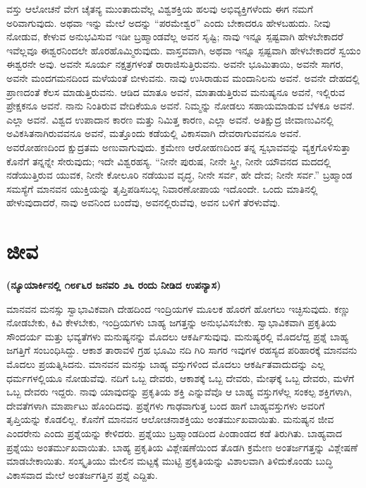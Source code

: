 
ವಸ್ತು ಆಲೋಚನೆ ವೇಗ ಚೈತನ್ಯ ಮುಂತಾದುವೆಲ್ಲ ವಿಶ್ವಶಕ್ತಿಯ ಹಲವು ಅಭಿವ್ಯಕ್ತಿಗಳೆಂದು ಈಗ ನಮಗೆ ಅರಿವಾಗುವುದು. ಅಥವಾ ಇನ್ನು ಮೇಲೆ ಅದನ್ನು “ಪರಮೇಶ್ವರ” ಎಂದು ಬೇಕಾದರೂ ಹೇಳಬಹುದು. ನೀವು ನೋಡುವ, ಕೇಳುವ ಅನುಭವಿಸುವ ಇಡೀ ಬ್ರಹ್ಮಾಂಡವೆಲ್ಲ ಅವನ ಸೃಷ್ಟಿ; ನಾವು ಇನ್ನೂ ಸ್ಪಷ್ಟವಾಗಿ ಹೇಳಬೇಕಾದರೆ ಇವೆಲ್ಲವೂ ಈಶ್ವರನಿಂದಲೇ ಹೊರಹೊಮ್ಮಿರುವುದು. ವಾಸ್ತವವಾಗಿ, ಅಥವಾ ಇನ್ನೂ ಸ್ಪಷ್ಟವಾಗಿ ಹೇಳಬೇಕಾದರೆ ಸ್ವಯಂ ಈಶ್ವರನೇ ಅವು. ಅವನೇ ಸೂರ್ಯ ನಕ್ಷತ್ರಗಳಂತೆ ರಾರಾಜಿಸುತ್ತಿರುವನು. ಅವನೇ ಭೂಮಿತಾಯಿ, ಅವನೇ ಸಾಗರ, ಅವನೇ ಮಂದಗಮನದಿಂದ ಮಳೆಯಂತೆ ಬೀಳುವನು. ನಾವು ಉಸಿರಾಡುವ ಮಂದಾನಿಲನು ಅವನೆ. ಅವನೇ ದೇಹದಲ್ಲಿ ಪ್ರಾಣದಂತೆ ಕೆಲಸ ಮಾಡುತ್ತಿರುವನು. ಆಡಿದ ಮಾತೂ ಅವನೆ, ಮಾತಾಡುತ್ತಿರುವ ಮನುಷ್ಯನೂ ಅವನೆ, ಇಲ್ಲಿರುವ ಪ್ರೇಕ್ಷಕನೂ ಅವನೆ. ನಾನು ನಿಂತಿರುವ ವೇದಿಕೆಯೂ ಅವನೆ. ನಿಮ್ಮನ್ನು ನೋಡಲು ಸಹಾಯಮಾಡುವ ಬೆಳಕೂ ಅವನೆ. ಎಲ್ಲಾ ಅವನೆ. ವಿಶ್ವದ ಉಪಾದಾನ ಕಾರಣ ಮತ್ತು ನಿಮಿತ್ತ ಕಾರಣ, ಎಲ್ಲಾ ಅವನೆ. ಅತಿಕ್ಷುದ್ರ ಜೀವಾಣುವಿನಲ್ಲಿ ಅವಿಕಸಿತನಾಗಿರುವವನೂ ಅವನೆ, ಮತ್ತೊಂದು ಕಡೆಯಲ್ಲಿ ವಿಕಾಸವಾಗಿ ದೇವರಾಗುವವನೂ ಅವನೆ. ಅವರೋಹಣದಿಂದ ಕ್ಷುದ್ರತಮ ಅಣುವಾಗುವುದು. ಕ್ರಮೇಣ ಆರೋಹಣದಿಂದ ತನ್ನ ಸ್ವಭಾವವನ್ನು ವ್ಯಕ್ತಗೊಳಿಸುತ್ತಾ ಕೊನೆಗೆ ತನ್ನನ್ನೇ ಸೇರುವುದು; ಇದೇ ವಿಶ್ವರಹಸ್ಯ. “ನೀನೇ ಪುರುಷ, ನೀನೇ ಸ್ತ್ರೀ, ನೀನೇ ಯೌವನದ ಮದದಲ್ಲಿ ನಡೆಯುತ್ತಿರುವ ಯುವಕ, ನೀನೇ ಕೋಲೂರಿ ನಡೆಯುವ ವೃದ್ಧ, ನೀನೇ ಸರ್ವ, ಹೇ ದೇವ; ನೀನೇ ಸರ್ವ.” ಬ್ರಹ್ಮಾಂಡ ಸಮಸ್ಯೆಗೆ ಮಾನವನ ಯುಕ್ತಿಯನ್ನು ತೃಪ್ತಿಪಡಿಸಬಲ್ಲ ನಿವಾರಣೋಪಾಯ ಇದೊಂದೇ. ಒಂದು ಮಾತಿನಲ್ಲಿ ಹೇಳುವುದಾದರೆ, ನಾವು ಅವನಿಂದ ಬಂದೆವು, ಅವನಲ್ಲಿರುವೆವು, ಅವನ ಬಳಿಗೆ ತೆರಳುವೆವು.

\chapter{ಜೀವ}%

\centerline{\textbf{(ನ್ಯೂಯಾರ್ಕಿನಲ್ಲಿ ೧೮೯೬ರ ಜನವರಿ ೨೬ ರಂದು ನೀಡಿದ ಉಪನ್ಯಾಸ)}}

ಮಾನವನ ಮನಸ್ಸು ಸ್ವಾಭಾವಿಕವಾಗಿ ದೇಹದಿಂದ ಇಂದ್ರಿಯಗಳ ಮೂಲಕ ಹೊರಗೆ ಹೋಗಲು ಇಚ್ಛಿಸುವುದು. ಕಣ್ಣು ನೋಡಬೇಕು, ಕಿವಿ ಕೇಳಬೇಕು, ಇಂದ್ರಿಯಗಳು ಬಾಹ್ಯ ಜಗತ್ತನ್ನು ಅನುಭವಿಸಬೇಕು. ಸ್ವಾಭಾವಿಕವಾಗಿ ಪ್ರಕೃತಿಯ ಸೌಂದರ್ಯ ಮತ್ತು ಭವ್ಯತೆಗಳು ಮನುಷ್ಯನನ್ನು ಮೊದಲು ಆಕರ್ಷಿಸುವುವು. ಮನುಷ್ಯರಲ್ಲಿ ಮೊದಲೆದ್ದ ಪ್ರಶ್ನೆ ಬಾಹ್ಯ ಜಗತ್ತಿಗೆ ಸಂಬಂಧಿಸಿದ್ದು. ಆಕಾಶ ತಾರಾವಳಿ ಗ್ರಹ ಭೂಮಿ ನದಿ ಗಿರಿ ಸಾಗರ ಇವುಗಳ ರಹಸ್ಯದ ಪರಿಹಾರಕ್ಕೆ ಮಾನವನು ಮೊದಲು ಪ್ರಯತ್ನಿಸಿದನು. ಮಾನವನ ಮನಸ್ಸು ಬಾಹ್ಯ ವಸ್ತುಗಳಿಂದ ಮೊದಲು ಆಕರ್ಷಿತವಾದುದನ್ನು ಎಲ್ಲ ಧರ್ಮಗಳಲ್ಲಿಯೂ ನೋಡುವೆವು. ನದಿಗೆ ಒಬ್ಬ ದೇವರು, ಆಕಾಶಕ್ಕೆ ಒಬ್ಬ ದೇವರು, ಮೇಘಕ್ಕೆ ಒಬ್ಬ ದೇವರು, ಮಳೆಗೆ ಒಬ್ಬ ದೇವರು ಇದ್ದರು. ನಾವು ಯಾವುದನ್ನು ಪ್ರಕೃತಿಯ ಶಕ್ತಿ ಎನ್ನುವೆವೊ ಆ ಬಾಹ್ಯ ವಸ್ತುಗಳೆಲ್ಲ ಸಂಕಲ್ಪ ಶಕ್ತಿಗಳಾಗಿ, ದೇವತೆಗಳಾಗಿ ಮಾರ್ಪಾಟು ಹೊಂದಿದವು. ಪ್ರಶ್ನೆಗಳು ಗಾಢವಾಗುತ್ತ ಬಂದ ಹಾಗೆ ಬಾಹ್ಯವಸ್ತುಗಳು ಅವರಿಗೆ ತೃಪ್ತಿಯನ್ನು ಕೊಡಲಿಲ್ಲ. ಕೊನೆಗೆ ಮಾನವನ ಆಲೋಚನಾಶಕ್ತಿಯು ಅಂತರ್ಮುಖವಾಯಿತು. ಮನುಷ್ಯನ ಜೀವ ಎಂದರೇನು ಎಂದು ಪ್ರಶ್ನೆಯನ್ನು ಕೇಳಿದರು. ಪ್ರಶ್ನೆಯು ಬ್ರಹ್ಮಾಂಡದಿಂದ ಪಿಂಡಾಂಡದ ಕಡೆ ತಿರುಗಿತು. ಬಾಹ್ಯವಾದ ಪ್ರಶ್ನೆಯು ಅಂತರ್ಮುಖವಾಯಿತು. ಬಾಹ್ಯ ಪ್ರಕೃತಿಯ ವಿಶ್ಲೇಷಣೆಯಿಂದ ತೊಡಗಿ ಕ್ರಮೇಣ ಅಂತರ್ಜಗತ್ತನ್ನು ವಿಶ್ಲೇಷಣೆ ಮಾಡಬೇಕಾಯಿತು. ಸಂಸ್ಕೃತಿಯು ಮೇಲಿನ ಮಟ್ಟಕ್ಕೆ ಮುಟ್ಟಿ ಪ್ರಕೃತಿಯನ್ನು ವಿಶಾಲವಾಗಿ ತಿಳಿದುಕೊಂಡು ಬುದ್ಧಿ ವಿಕಾಸವಾದ ಮೇಲೆ ಅಂತರ್ಜಗತ್ತಿನ ಪ್ರಶ್ನೆ ಎದ್ದಿತು.


